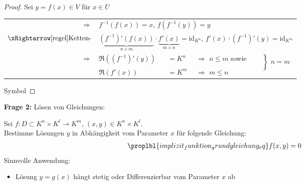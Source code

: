 \begin{proof}
	\NoEndMark
	Sei $y = f(x)\in V$ für $x\in U$\\ \begin{tabularx}{\linewidth}{r@{\ \ }l@{$\,$}l@{\ }l@{\ }X}
		$\Rightarrow$ & \multicolumn{4}{l}{$f^{-1}(f(x)) = x$,  $f(f^{-1}(y)) = y$}\\
		$\xRightarrow[\text{regel}]{\text{Ketten-}}$ & \multicolumn{4}{l}{$\underbrace{(f^{-1})'(f(x))}_{n\times m} \cdot \underbrace{f'(x)}_{m\times n} = \mathrm{id}_{K^n}$, $f'(x) \cdot (f^{-1})'(y) = \mathrm{id}_{K^m}$} \\
		$\Rightarrow$ & $\Re\left( (f^{-1})'(y)\right)$ & $= K^n$ & $\Rightarrow$ $n\le m$ sowie & \multirow{2}{*}{$\left. \phantom{\dfrac{1}{1}}\right\}$ $n = m$} \\
		& $\Re\left( f'(x) \right)$ & $ = K^m$ & $\Rightarrow$ $m\le n$
	\end{tabularx}

	\hfill\csname\InTheoType Symbol\endcsname
\end{proof}

\textbf{Frage 2:} Lösen von Gleichungen:
	
	Sei $f:D\subset K^n\times K^l\to K^m$, $(x,y)\in K^n\times K^l$.\\
	
	Bestimme Lösungen $y$ in Abhängigkeit vom Parameter $x$ für folgende Gleichung: \begin{align}
		\proplbl{implizit_funktion_grundgleichung_eq}
		f(x,y) = 0
	\end{align}
	Sinnvolle Anwendung: \begin{itemize}
		\item Lösung $y = g(x)$ hängt stetig oder Differenzierbar vom Parameter $x$ ab
	\end{itemize}

